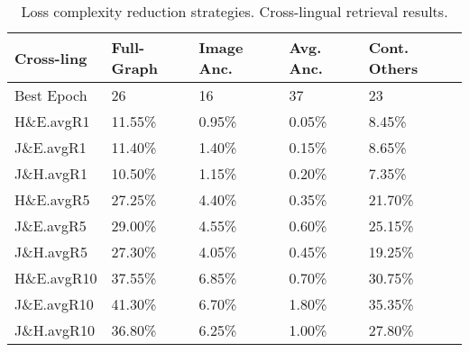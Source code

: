 \begin{table}
    \centering
\begin{tabular}{lllll}
\toprule
{Cross-ling} & Full-Graph & Image Anc. & Avg. Anc. & Cont. Others \\
\midrule
Best Epoch  &                      26 &                           16 &                   37 &                            23 \\
\midrule
H\&E.avgR1   &                  11.55\% &                        0.95\% &                0.05\% &                         8.45\% \\
J\&E.avgR1   &                  11.40\% &                        1.40\% &                0.15\% &                         8.65\% \\
J\&H.avgR1   &                  10.50\% &                        1.15\% &                0.20\% &                         7.35\% \\
\midrule
H\&E.avgR5   &                  27.25\% &                        4.40\% &                0.35\% &                        21.70\% \\
J\&E.avgR5   &                  29.00\% &                        4.55\% &                0.60\% &                        25.15\% \\
J\&H.avgR5   &                  27.30\% &                        4.05\% &                0.45\% &                        19.25\% \\
\midrule
H\&E.avgR10  &                  37.55\% &                        6.85\% &                0.70\% &                        30.75\% \\
J\&E.avgR10  &                  41.30\% &                        6.70\% &                1.80\% &                        35.35\% \\
J\&H.avgR10  &                  36.80\% &                        6.25\% &                1.00\% &                        27.80\% \\
\bottomrule
\end{tabular}
\caption{Loss complexity reduction strategies. Cross-lingual retrieval results.}
\label{table:complexity_opts_cling_ret}
\end{table}
